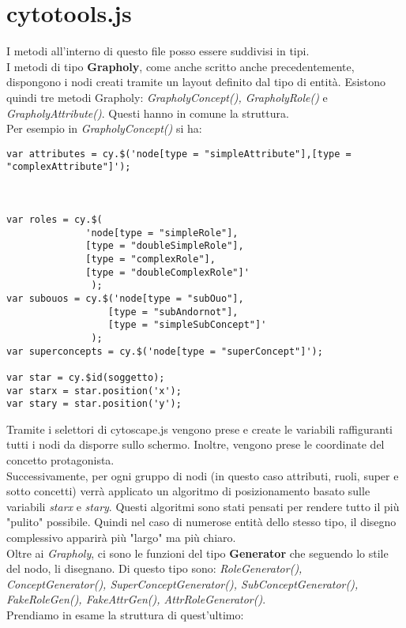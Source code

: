 \documentclass[Lau,binding=0.6cm]{sapthesis}
\begin{document}
\section{cytotools.js}
I metodi all'interno di questo file posso essere suddivisi in tipi.
\\I metodi di tipo \textbf{Grapholy}, come anche scritto anche precedentemente, dispongono i nodi creati tramite un layout definito dal tipo di entità. Esistono quindi tre metodi Grapholy: \textit{GrapholyConcept(), GrapholyRole()} e \textit{GrapholyAttribute()}.
Questi hanno in comune la struttura. \\Per esempio in  \textit{GrapholyConcept()} si ha:
\begin{verbatim}
var attributes = cy.$('node[type = "simpleAttribute"],[type = "complexAttribute"]');



var roles = cy.$(
              'node[type = "simpleRole"],
              [type = "doubleSimpleRole"],
              [type = "complexRole"],
              [type = "doubleComplexRole"]'
               );
var subouos = cy.$('node[type = "subOuo"],
                  [type = "subAndornot"],
                  [type = "simpleSubConcept"]'
               );
var superconcepts = cy.$('node[type = "superConcept"]');
   
var star = cy.$id(soggetto);
var starx = star.position('x');
var stary = star.position('y');
\end{verbatim}
Tramite i selettori di cytoscape.js vengono prese e create le variabili raffiguranti tutti i nodi da disporre sullo schermo.
Inoltre, vengono prese le coordinate del concetto protagonista.
\\Successivamente, per ogni gruppo di nodi (in questo caso attributi, ruoli, super  e sotto concetti) verrà applicato un algoritmo di posizionamento basato sulle variabili \textit{starx} e \textit{stary}. Questi algoritmi sono stati pensati per rendere tutto il più "pulito" possibile. Quindi nel caso di numerose entità dello stesso tipo, il disegno complessivo apparirà più "largo" ma più chiaro.
\\Oltre ai \textit{Grapholy}, ci sono le funzioni del tipo \textbf{Generator} che seguendo lo stile del nodo, li disegnano.
Di questo tipo sono: \textit{RoleGenerator(), ConceptGenerator(), SuperConceptGenerator(), SubConceptGenerator(), FakeRoleGen(), FakeAttrGen(), AttrRoleGenerator()}.
\\Prendiamo in esame la struttura di quest'ultimo:
\end{document}

